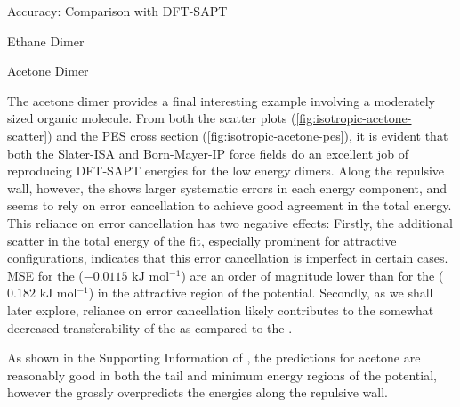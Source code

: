 \begin{subsection}{Accuracy: Comparison with DFT-SAPT}
\begin{subsubsection}{Ethane Dimer}
\end{subsubsection}
\begin{subsubsection}{Acetone Dimer}

The acetone dimer provides a final interesting example involving a moderately sized
organic molecule.
From both the scatter plots (\cref{fig:isotropic-acetone-scatter}) and the PES cross section
(\cref{fig:isotropic-acetone-pes}), it is evident that both the Slater-ISA and
Born-Mayer-IP force fields do an
excellent job of reproducing DFT-SAPT energies for the low energy dimers.
Along the repulsive wall, however, the \saptff shows larger systematic
errors in each energy component, and seems to rely on error cancellation
to achieve good agreement in the total energy.
This reliance on error cancellation has two negative effects: 
Firstly, the additional scatter in the total energy of the \saptff
fit, especially prominent for attractive configurations, indicates that this
error cancellation is imperfect in certain cases. MSE
for the \isaffold ($-0.0115$ kJ mol$^{-1}$) are an order of magnitude lower than for
the \saptff ($0.182$ kJ mol$^{-1}$) in the attractive region of the potential.  Secondly,
as we shall later explore, reliance on error cancellation likely
contributes to the somewhat decreased transferability of the \saptff as
compared to the \isaffold. 

As shown in the Supporting Information of , the
\ljff predictions for acetone are reasonably good in both the tail and minimum
energy regions of the potential, however the \ljff grossly overpredicts the
\saptpbeo energies along the repulsive wall.


\end{subsubsection}
\end{subsection}
